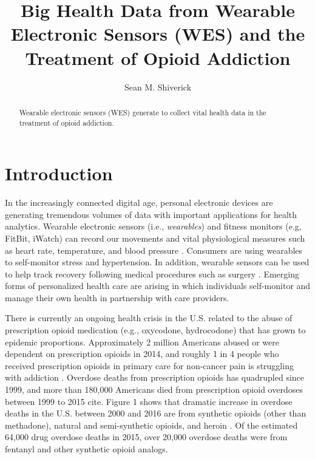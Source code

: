 \documentclass[sigconf]{acmart}
\begin{document}
\title{Big Health Data from Wearable Electronic Sensors (WES) and 
the Treatment of Opioid Addiction}

\author{Sean M. Shiverick}


\begin{abstract}
Wearable electronic sensors (WES) generate to collect
vital health data in the treatment of opioid addiction. 
\end{abstract}


\maketitle


\section{Introduction}

In the increasingly connected digital age, personal electronic devices are 
generating tremendous volumes of data with important applications for 
health analytics. Wearable electronic sensors (i.e., \emph{wearables}) and
fitness monitors (e.g, FitBit, iWatch) can record our movements and vital 
physiological measures such as heart rate, temperature, and blood pressure 
\cite{metcalf16}. Consumers are using wearables to self-monitor stress 
and hypertension. In addition, wearable sensors can be used to help track
recovery following medical procedures such as surgery \cite{atallah11}. 
Emerging forms of personalized health care are arising in which individuals 
self-monitor and manage their own health in partnership with care providers.


There is currently an ongoing health crisis in the U.S. related to the abuse 
of prescription opioid medication (e.g., oxycodone, hydrocodone) that has 
grown to epidemic proportions. Approximately 2 million Americans abused or were
dependent on prescription opioids in 2014, and roughly 1 in 4 people who received
prescription opioids in primary care for non-cancer pain is struggling with 
addiction \cite{cdc17}. Overdose deaths from prescription opioids has quadrupled 
since 1999, and more than 180,000 Americans died from prescription opioid 
overdoses between 1999 to 2015 cite. Figure 1 shows that dramatic increase in 
overdose deaths in the U.S. between 2000 and 2016 are from synthetic opioids 
(other than methadone), natural and semi-synthetic opioids, and heroin 
\cite{nida17}. Of the estimated 64,000 drug overdose deaths in 2015, over 
20,000 overdose deaths were from fentanyl and other synthetic opioid analogs. 
\end{document}

